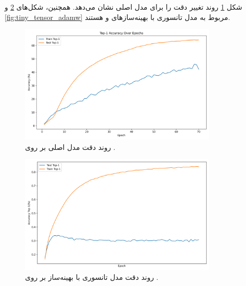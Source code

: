 شکل \ref{fig:tiny_original_top1} روند تغییر دقت  را برای مدل اصلی  نشان می‌دهد.  
همچنین، شکل‌های \ref{fig:tiny_tensor_adam} و \ref{fig:tiny_tensor_adamw} مربوط به مدل تانسوری با بهینه‌سازهای  و  هستند.

\begin{figure}[ht]
	\centering
	\includegraphics[width=0.85\textwidth]{transformer_images/results/tiny_image_net_original.png}
	\caption{روند دقت  مدل اصلی  بر روی .}
	\label{fig:tiny_original_top1}
\end{figure}

\begin{figure}[ht]
	\centering
	\includegraphics[width=0.85\textwidth]{transformer_images/results/tiny_image_net_tensorized_2.png}
	\caption{روند دقت  مدل تانسوری با بهینه‌ساز  بر روی .}
	\label{fig:tiny_tensor_adam}
\end{figure}

